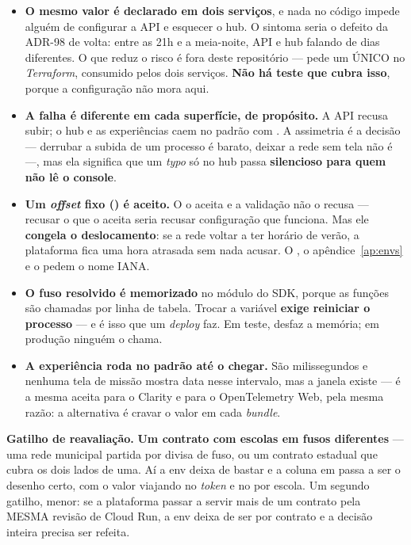 \begin{itemize}
  \item \textbf{O mesmo valor é declarado em dois serviços}, e nada no código
    impede alguém de configurar a API e esquecer o hub. O sintoma seria o defeito
    da ADR-98 de volta: entre as 21h e a meia-noite, API e hub falando de dias
    diferentes. O que reduz o risco é fora deste repositório --- 
    pede um  ÚNICO no \emph{Terraform}, consumido pelos dois
    serviços. \textbf{Não há teste que cubra isso}, porque a configuração não
    mora aqui.
  \item \textbf{A falha é diferente em cada superfície, de propósito.} A API
    recusa subir; o hub e as experiências caem no padrão com .
    A assimetria é a decisão --- derrubar a subida de um processo é barato,
    deixar a rede sem tela não é ---, mas ela significa que um \emph{typo} só no
    hub passa \textbf{silencioso para quem não lê o console}.
  \item \textbf{Um \emph{offset} fixo () é aceito.} O  o
    aceita e a validação não o recusa --- recusar o que o  aceita seria
    recusar configuração que funciona. Mas ele \textbf{congela o deslocamento}: se
    a rede voltar a ter horário de verão, a plataforma fica uma hora atrasada sem
    nada acusar. O , o apêndice~\ref{ap:envs} e o
     pedem o nome IANA.
  \item \textbf{O fuso resolvido é memorizado} no módulo do SDK, porque as
    funções são chamadas por linha de tabela. Trocar a variável \textbf{exige
    reiniciar o processo} --- e é isso que um \emph{deploy} faz. Em teste,
     desfaz a memória; em produção ninguém o
    chama.
  \item \textbf{A experiência roda no padrão até o  chegar.} São
    milissegundos e nenhuma tela de missão mostra data nesse intervalo, mas a
    janela existe --- é a mesma aceita para o Clarity e para o OpenTelemetry Web,
    pela mesma razão: a alternativa é cravar o valor em cada \emph{bundle}.
\end{itemize}

\textbf{Gatilho de reavaliação.} \textbf{Um contrato com escolas em fusos
diferentes} --- uma rede municipal partida por divisa de fuso, ou um contrato
estadual que cubra os dois lados de uma. Aí a env deixa de bastar e a coluna
 em  passa a ser o desenho certo, com o valor viajando no
\emph{token} e no  por escola. Um segundo gatilho, menor: se a
plataforma passar a servir mais de um contrato pela MESMA revisão de Cloud Run,
a env deixa de ser por contrato e a decisão inteira precisa ser refeita.

